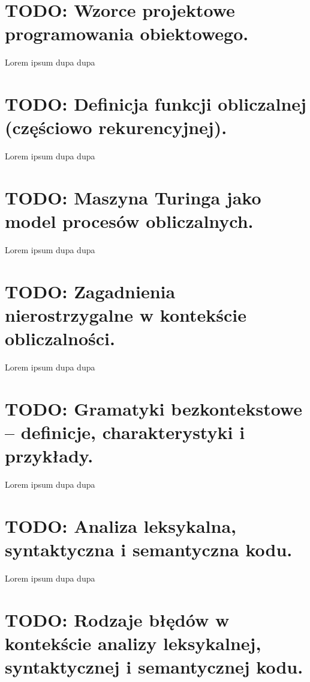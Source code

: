 \documentclass[a4paper,12pt,oneside]{book}
\begin{document}
	\setcounter{section}{42}
	\section{\color{red} TODO:  Wzorce projektowe programowania obiektowego. }
					
					Lorem ipsum dupa dupa
	
	\setcounter{section}{43}
	\section{\color{red} TODO: Definicja funkcji obliczalnej (częściowo rekurencyjnej). }
					
					Lorem ipsum dupa dupa
	
	\setcounter{section}{44}
	\section{\color{red} TODO: Maszyna Turinga jako model procesów obliczalnych. }
					
					Lorem ipsum dupa dupa
	
	\setcounter{section}{45}
	\section{\color{red} TODO: Zagadnienia nierostrzygalne w kontekście obliczalności. }
					
					Lorem ipsum dupa dupa
	
	\setcounter{section}{48}
	\section{\color{red} TODO:  Gramatyki bezkontekstowe – definicje, charakterystyki i przykłady. }
					
					Lorem ipsum dupa dupa
	
	\setcounter{section}{49}
	\section{\color{red} TODO: Analiza leksykalna, syntaktyczna i semantyczna kodu. }
					
					Lorem ipsum dupa dupa
	
	\setcounter{section}{50}
	\section{\color{red} TODO: Rodzaje błędów w kontekście analizy leksykalnej, syntaktycznej i semantycznej kodu.}
					
\end{document}
